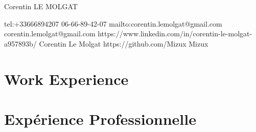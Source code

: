 \documentclass{resume}
\begin{document}
\ContactName
{Corentin LE MOLGAT} %

\iffalse
\ContactInfoPhysical
{51 Rue du Docteur Denoyelle} %
{Tours, Centre, 37000}        %
{France}                      %
\fi

\ContactInfoDigital
  {tel:+33666894207}                    %
  {06-66-89-42-07}                      %
  {mailto:corentin.lemolgat@gmail.com}  %
  {corentin.lemolgat@gmail.com}         %
  {https://www.linkedin.com/in/corentin-le-molgat-a957893b/} %
  {Corentin Le Molgat}                                       %
  {https://github.com/Mizux} %
  {Mizux}                    %

 {
  \section{{\faBriefcase} Work Experience}
} {
  \section{{\faBriefcase} Exp\'{e}rience Professionnelle}
}
\end{document}
